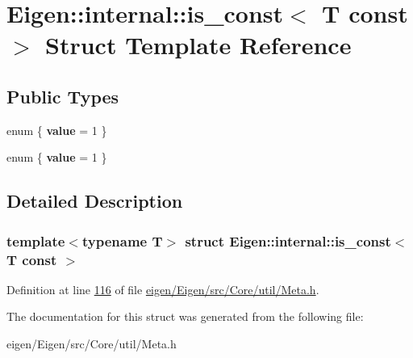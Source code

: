 \hypertarget{struct_eigen_1_1internal_1_1is__const_3_01_t_01const_01_4}{}\section{Eigen\+:\+:internal\+:\+:is\+\_\+const$<$ T const $>$ Struct Template Reference}
\label{struct_eigen_1_1internal_1_1is__const_3_01_t_01const_01_4}
\subsection*{Public Types}
\begin{DoxyCompactItemize}
\item 
\mbox{\label{struct_eigen_1_1internal_1_1is__const_3_01_t_01const_01_4_abc6fafa5497a8bb777ddd3b984f89d69}} 
enum \{ {\bfseries value} = 1
 \}
\item 
\mbox{\label{struct_eigen_1_1internal_1_1is__const_3_01_t_01const_01_4_ada42ddff16c18a295cce2ad94abd5eed}} 
enum \{ {\bfseries value} = 1
 \}
\end{DoxyCompactItemize}


\subsection{Detailed Description}
\subsubsection*{template$<$typename T$>$\newline
struct Eigen\+::internal\+::is\+\_\+const$<$ T const $>$}



Definition at line \hyperlink{eigen_2_eigen_2src_2_core_2util_2_meta_8h_source_l00116}{116} of file \hyperlink{eigen_2_eigen_2src_2_core_2util_2_meta_8h_source}{eigen/\+Eigen/src/\+Core/util/\+Meta.\+h}.



The documentation for this struct was generated from the following file\+:\begin{DoxyCompactItemize}
\item 
eigen/\+Eigen/src/\+Core/util/\+Meta.\+h\end{DoxyCompactItemize}
